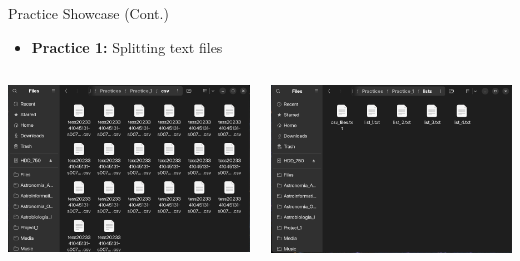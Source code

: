 \documentclass[12pt, aspectratio=169]{beamer}
\begin{document}
    \begin{frame}[t]{Practice Showcase (Cont.)}
    \begin{itemize}
      \item \textbf{Practice 1:} Splitting text files \vspace{2.5mm}
    \end{itemize}
    \begin{columns}
      \begin{column}{0.5\textwidth}
        \centering
        \includegraphics[width=\linewidth]{figures/1-3.png}
      \end{column}
      \begin{column}{0.5\textwidth}
        \centering
        \includegraphics[width=\linewidth]{figures/1-4.png}
      \end{column}
    \end{columns}
  \end{frame}
\end{document}
